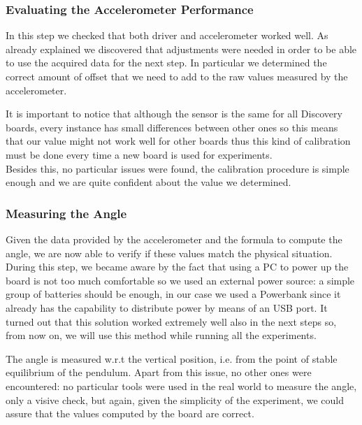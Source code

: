 \subsubsection{Evaluating the Accelerometer Performance}
In this step we checked that both driver and accelerometer worked well. As already explained we discovered that adjustments were needed in order to be able to use the acquired data for the next step. In particular we determined the correct amount of offset that we need to add to the raw values measured by the accelerometer. \par It is important to notice that although the sensor is the same for all Discovery boards, every instance has small differences between other ones so this means that our value might not work well for other boards thus this kind of calibration must be done every time a new board is used for experiments. \\ Besides this, no particular issues were found, the calibration procedure is simple enough and we are quite confident about the value we determined.
\subsubsection{Measuring the Angle}
Given the data provided by the accelerometer and the formula to compute the angle, we are now able to verify if these values match the physical situation. During this step, we became aware by the fact that using a PC to power up the board is not too much comfortable so we used an external power source: a simple group of batteries should be enough, in our case we used a Powerbank since it already has the capability to distribute power by means of an USB port. It turned out that this solution worked extremely well also in the next steps so, from now on, we will use this method while running all the experiments. \par The angle is measured w.r.t the vertical position, i.e. from the point of stable equilibrium of the pendulum. Apart from this issue, no other ones were encountered: no particular tools were used in the real world to measure the angle, only a visive check, but again, given the simplicity of the experiment, we could assure that the values computed by the board are correct. 
